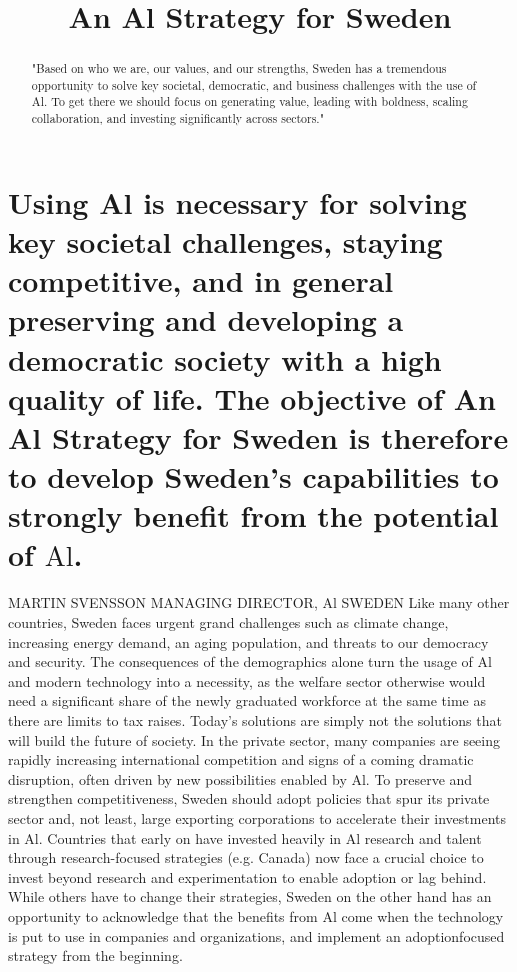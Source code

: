 \title{
An Al Strategy for Sweden
}
\section*{Using Al is necessary for solving key societal challenges, staying competitive, and in general preserving and developing a democratic society with a high quality of life. The objective of An Al Strategy for Sweden is therefore to develop Sweden's capabilities to strongly benefit from the potential of \(\mathrm{Al}\).}
\begin{abstract}
"Based on who we are, our values, and our strengths, Sweden has a tremendous opportunity to solve key societal, democratic, and business challenges with the use of Al. To get there we should focus on generating value, leading with boldness, scaling collaboration, and investing significantly across sectors."
\end{abstract}
MARTIN SVENSSON
MANAGING DIRECTOR, Al SWEDEN
Like many other countries, Sweden faces urgent grand challenges such as climate change, increasing energy demand, an aging population, and threats to our democracy and security. The consequences of the demographics alone turn the usage of Al and modern technology into a necessity, as the welfare sector otherwise would need a significant share of the newly graduated workforce at the same time as there are limits to tax raises. Today's solutions are simply not the solutions that will build the future of society.
In the private sector, many companies are seeing rapidly increasing international competition and signs of a coming dramatic disruption, often driven by new possibilities enabled by Al. To preserve and strengthen competitiveness, Sweden should adopt policies that spur its private sector and, not least, large exporting corporations to accelerate their investments in Al.
Countries that early on have invested heavily in Al research and talent through research-focused strategies (e.g. Canada) now face a crucial choice to invest beyond research and experimentation to enable adoption or lag behind. While others have to change their strategies, Sweden on the other hand has an opportunity to acknowledge that the benefits from Al come when the technology is put to use in companies and organizations, and implement an adoptionfocused strategy from the beginning.

